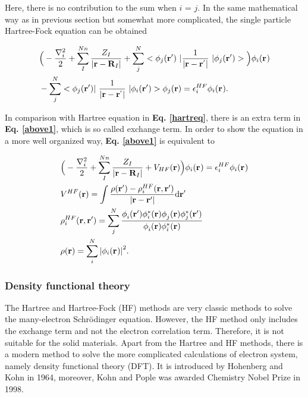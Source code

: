 \documentclass[a4paper, 12pt, titlepage,oneside,drop]{kthesis}
\begin{document}
Here, there is no contribution to the sum when $i$ = $j$. In the same mathematical way as in previous section but somewhat more complicated, the single particle Hartree-Fock equation can be obtained

\begin{equation}\begin{split}\label{above1}
& \Big( -\frac{\nabla^{2}_{i}}{2} + \sum\limits_I^{{Nn}} \frac{Z_{I}}{|\textbf{r}-\textbf{R}_{I}|} + \sum\limits_{j}^{{N}} <\bwfn<j><'>\ | \frac{1}{|\textbf{r} - \textbf{r}^{'} |} \ | \bwfn<j><'>> \Big) \bwff<i><>  \\
& - \sum\limits_{j}^{{N}}  < \bwfn<j><'>|\ \frac{1}{|\textbf{r} - \textbf{r}^{'} |} \ | \bwfn<i><'> > \bwfn<j><>  = \epsilon_{i}^{{HF}} \bwff<i><>.
\end{split}\end{equation}

In comparison with Hartree equation in \textbf{Eq. \ref{hartreq}}, there is an extra term in \textbf{Eq. \ref{above1}}, which is so called exchange term. In order to show the equation in a more well organized way,
\textbf{Eq. \ref{above1}} is equivalent to

\begin{equation}\label{aaaaa}\begin{split}
& \Big( -\frac{\nabla^{2}_{i}}{2} +  \sum\limits_I^{{Nn}} \frac{Z_{I}}{|\textbf{r}-\textbf{R}_{I}|} +V_{HF}(\textbf{r}) \Big)  \bwff<i><>  = \epsilon_{i}^{{HF}}   \bwff<i><> \\
&  V^{HF}(\textbf{r})= \int \frac{\rho(\textbf{r}{'}) - \rho_{{i}}^{{HF}}(\textbf{r},\textbf{r}{'})}{|\textbf{r} - \textbf{r}{'} |}  \mathrm{d}\textbf{r}{'} \\
& \rho_{{i}}^{{HF}}(\textbf{r},\textbf{r}{'}) = \sum\limits_j^N \frac{\phi_{i}^{}(\textbf{r}{'}) \phi_{i}^{*}(\textbf{r}{}) \phi_{j}^{}(\textbf{r}{}) \phi_{j}^{*}(\textbf{r}{'})} {\phi_{i}^{}(\textbf{r}) \phi_{i}^{*}(\textbf{r})}  \\
& \rho(\textbf{r}) = \sum\limits_i^N  {|\bwff<i><>|}^{2}.
\end{split}
\end{equation}


\subsubsection{Density functional theory}
The Hartree and Hartree-Fock (HF) methods are very classic methods to solve the many-electron Schrödinger equation. However, the HF method only includes the exchange term and not the electron correlation term. Therefore, it is not suitable 
for the solid materials. Apart from the Hartree and HF methods, there is a modern method to solve the more complicated calculations of electron system, namely density functional theory (DFT). 
It is introduced by Hohenberg and Kohn in 1964, moreover, Kohn and Pople was awarded Chemistry Nobel Prize in 1998.
\end{document}
